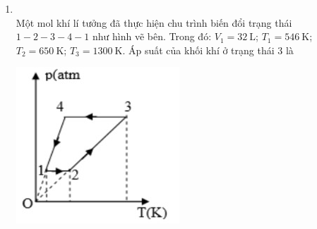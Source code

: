 \begin{enumerate}[label=\bfseries Câu \arabic*:, leftmargin=1.7cm]
\item {}\\
Một mol khí lí tưởng đã thực hiện chu trình biến đổi trạng thái $1-2-3-4-1$ như hình vẽ bên. Trong đó: $V_1=\SI{32}{\liter}$; $T_1=\SI{546}{\kelvin}$; $T_2=\SI{650}{\kelvin}$; $T_3=\SI{1300}{\kelvin}$. Áp suất của khối khí ở trạng thái 3 là
\begin{center}
	\includegraphics[width=0.35\linewidth]{../figs/VN12-Y24-PH-SYL-014P-7}
\end{center}


\end{enumerate}
